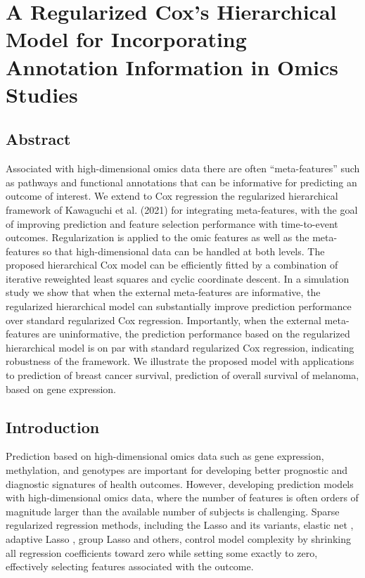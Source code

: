 \chapter{A Regularized Cox’s Hierarchical Model for Incorporating Annotation Information in Omics Studies}
\label{cha:xrnetcox}

\section{Abstract}
Associated with high-dimensional omics data there are often “meta-features” such as pathways and functional annotations that can be informative for predicting an outcome of interest. We extend to Cox regression the regularized hierarchical framework of Kawaguchi et al. (2021) for integrating meta-features, with the goal of improving prediction and feature selection performance with time-to-event outcomes. Regularization is applied to the omic features as well as the meta-features so that high-dimensional data can be handled at both levels. The proposed hierarchical Cox model can be efficiently fitted by a combination of iterative reweighted least squares and cyclic coordinate descent. In a simulation study we show that when the external meta-features are informative, the regularized hierarchical model can substantially improve prediction performance over standard regularized Cox regression. Importantly, when the external meta-features are uninformative, the prediction performance based on the regularized hierarchical model is on par with standard regularized Cox regression, indicating robustness of the framework. We illustrate the proposed model with applications to prediction of breast cancer survival, prediction of overall survival of melanoma, based on gene expression.

\section{Introduction}
Prediction based on high-dimensional omics data such as gene expression, methylation, and genotypes are important for developing better prognostic and diagnostic signatures of health outcomes. However, developing prediction models with high-dimensional omics data, where the number of features is often orders of magnitude larger than the available number of subjects is challenging. Sparse regularized regression methods, including the Lasso \citep{tibshirani1996regression} and its variants, elastic net \citep{zou2005regularization}, adaptive Lasso \citep{zou2006adaptive}, group Lasso \citep{yuan2006model} and others, control model complexity by shrinking all regression coefficients toward zero while setting some exactly to zero, effectively selecting features associated with the outcome. 


